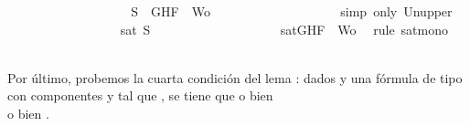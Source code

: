 \begin{isabellebody}
\ \ \ \ \ \ \ \ \ \ \ \ \ \ \ \ \isamarkupfalse%
\ \isamarkupfalse%
\ {\isachardoublequoteopen}S\ {\isasymsubseteq}\ {\isacharbraceleft}G{\isacharcomma}H{\isacharcomma}F{\isacharbraceright}\ {\isasymunion}\ Wo{\isachardoublequoteclose}\isanewline
\ \ \ \ \ \ \ \ \ \ \ \ \ \ \ \ \ \ \isamarkupfalse%
\ {\isacharparenleft}simp\ only{\isacharcolon}\ Un{\isacharunderscore}upper{}{\isacharparenright}\isanewline
\ \ \ \ \ \ \ \ \ \ \ \ \ \ \ \ \isamarkupfalse%
\ {\isachardoublequoteopen}sat\ S{\isachardoublequoteclose}\isanewline
\ \ \ \ \ \ \ \ \ \ \ \ \ \ \ \ \ \ \isamarkupfalse%
\ {\isacartoucheopen}sat{\isacharparenleft}{\isacharbraceleft}G{\isacharcomma}H{\isacharcomma}F{\isacharbraceright}\ {\isasymunion}\ Wo{\isacharparenright}{\isacartoucheclose}\ \isamarkupfalse%
\ {\isacharparenleft}rule\ sat{\isacharunderscore}mono{\isacharparenright}\isanewline
\ \ \ \ \ \ \ \ \ \ \ \ \ \ \isamarkupfalse%
\isanewline
\ \ \ \ \ \ \ \ \ \ \ \ \isamarkupfalse%
\isanewline
\ \ \ \ \ \ \ \ \ \ \isamarkupfalse%
\isanewline
\ \ \ \ \ \ \ \ \isamarkupfalse%
\isanewline
\ \ \ \ \ \ \isamarkupfalse%
\isanewline
\ \ \ \ \isamarkupfalse%
\isanewline
\ \ \isamarkupfalse%
\isanewline
{}\isamarkupfalse%
%
\endisatagproof
{\isafoldproof}%
%
\isadelimproof
%
\endisadelimproof
%
\begin{isamarkuptext}%
Por último, probemos la cuarta condición del lema : dados  y  una 
  fórmula de tipo \isa{{\isasymbeta}} con componentes  y  tal que , se tiene que o bien\\  
  o bien . 
  

\end{isamarkuptext}
\end{isabellebody}
